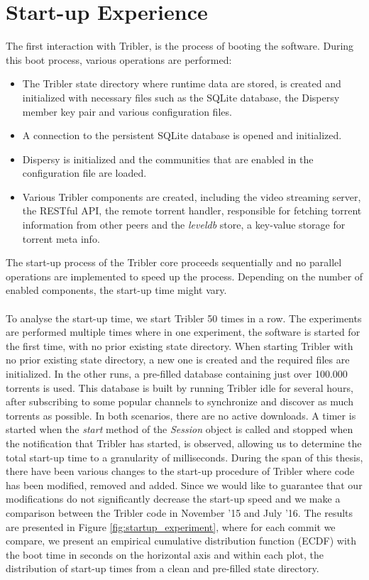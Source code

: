 \section{Start-up Experience}
\label{sec:startup-experience}
The first interaction with Tribler, is the process of booting the software. During this boot process, various operations are performed:
\begin{itemize}
	\item The Tribler state directory where runtime data are stored, is created and initialized with necessary files such as the SQLite database, the Dispersy member key pair and various configuration files.
	\item A connection to the persistent SQLite database is opened and initialized.
	\item Dispersy is initialized and the communities that are enabled in the configuration file are loaded.
	\item Various Tribler components are created, including the video streaming server, the RESTful API, the remote torrent handler, responsible for fetching torrent information from other peers and the \emph{leveldb} store, a key-value storage for torrent meta info.
\end{itemize}
The start-up process of the Tribler core proceeds sequentially and no parallel operations are implemented to speed up the process. Depending on the number of enabled components, the start-up time might vary.\\\\
To analyse the start-up time, we start Tribler 50 times in a row. The experiments are performed multiple times where in one experiment, the software is started for the first time, with no prior existing state directory. When starting Tribler with no prior existing state directory, a new one is created and the required files are initialized. In the other runs, a pre-filled database containing just over 100.000 torrents is used. This database is built by running Tribler idle for several hours, after subscribing to some popular channels to synchronize and discover as much torrents as possible. In both scenarios, there are no active downloads. A timer is started when the \emph{start} method of the \emph{Session} object is called and stopped when the notification that Tribler has started, is observed, allowing us to determine the total start-up time to a granularity of milliseconds. During the span of this thesis, there have been various changes to the start-up procedure of Tribler where code has been modified, removed and added. Since we would like to guarantee that our modifications do not significantly decrease the start-up speed and we make a comparison between the Tribler code in November '15 and July '16. The results are presented in Figure \ref{fig:startup_experiment}, where for each commit we compare, we present an empirical cumulative distribution function (ECDF) with the boot time in seconds on the horizontal axis and within each plot, the distribution of start-up times from a clean and pre-filled state directory.\\

